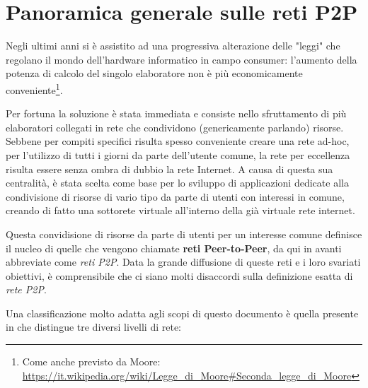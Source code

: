 \chapter{Panoramica generale sulle reti P2P}\label{panoramica-generale-sulle-reti-p2p}

Negli ultimi anni si è assistito ad una progressiva alterazione delle "leggi" che regolano il mondo dell'hardware informatico in campo consumer: l'aumento della potenza di calcolo del singolo elaboratore non è più economicamente conveniente\footnote{Come anche previsto da Moore: \url{https://it.wikipedia.org/wiki/Legge_di_Moore\#Seconda_legge_di_Moore}}.

Per fortuna la soluzione è stata immediata e consiste nello sfruttamento di più elaboratori collegati in rete che condividono (genericamente parlando) risorse. Sebbene per compiti specifici risulta spesso conveniente creare una rete ad-hoc, per l'utilizzo di tutti i giorni da parte dell'utente comune, la rete per eccellenza risulta essere senza ombra di dubbio la rete Internet. A causa di questa sua centralità, è stata scelta come base per lo sviluppo di applicazioni dedicate alla condivisione di risorse di vario tipo da parte di utenti con interessi in comune, creando di fatto una sottorete virtuale all'interno della già virtuale rete internet.

Questa convidisione di risorse da parte di utenti per un interesse comune definisce il nucleo di quelle che vengono chiamate \textbf{reti Peer-to-Peer}, da qui in avanti abbreviate come \emph{reti P2P}. Data la grande diffusione di queste reti e i loro svariati obiettivi, è comprensibile che ci siano molti disaccordi sulla definizione esatta di \emph{rete P2P}.

Una classificazione molto adatta agli scopi di questo documento è quella presente in \cite{core-concepts-p2p} che distingue tre diversi livelli di rete:

